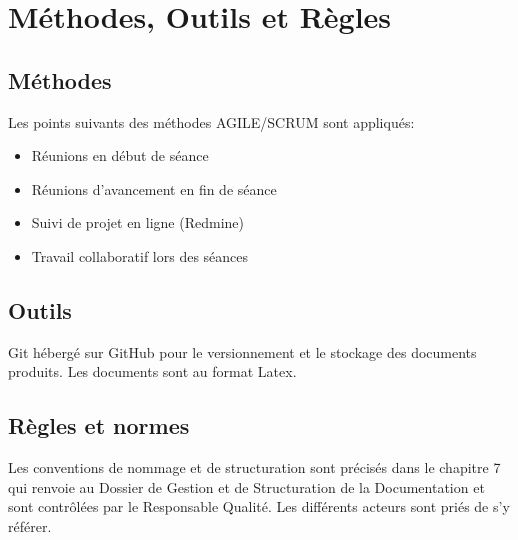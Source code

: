 \section{Méthodes, Outils et Règles}

\subsection{Méthodes}
Les points suivants des méthodes AGILE/SCRUM sont appliqués:
\begin{itemize}
\item Réunions en début de séance
\item Réunions d'avancement en fin de séance
\item Suivi de projet en ligne (Redmine)
\item Travail collaboratif lors des séances
\end{itemize}

\subsection{Outils}
Git hébergé sur GitHub pour le versionnement et le stockage
des documents produits. Les documents sont au format Latex.
\subsection{Règles et normes}
Les conventions de nommage et de structuration sont précisés dans le chapitre 
7 qui renvoie au Dossier de Gestion et de Structuration de la Documentation 
et sont contrôlées par le Responsable Qualité. Les différents acteurs sont 
priés de s'y référer.
\vfill
\pagebreak
